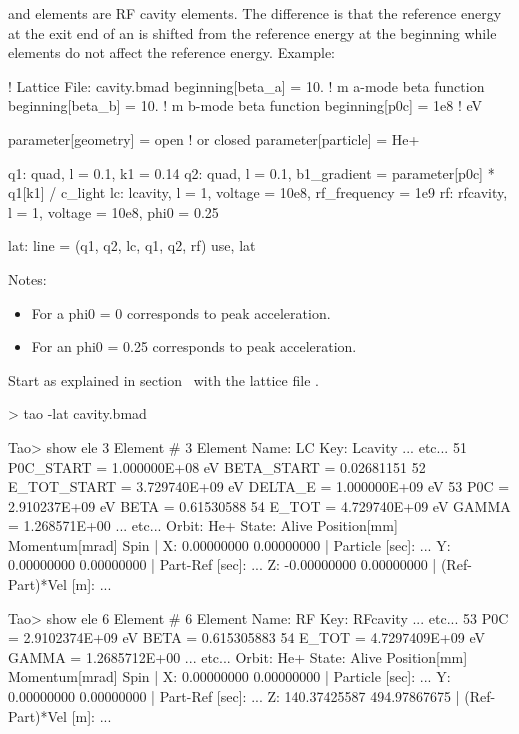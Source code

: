 \documentclass{hitec}
\begin{document}
 and   elements are RF cavity elements. The difference is that the reference
 energy at the exit end of an  is shifted from the reference energy at the beginning
 while  elements do not affect the reference energy. Example:
\begin{code}
! Lattice File: cavity.bmad
beginning[beta_a] = 10.   ! m  a-mode beta function
beginning[beta_b] = 10.   ! m  b-mode beta function
beginning[p0c] = 1e8   ! eV  

parameter[geometry] = open      ! or closed
parameter[particle] = He+ 

q1: quad, l = 0.1, k1 = 0.14
q2: quad, l = 0.1, b1_gradient = parameter[p0c] * q1[k1] / c_light
lc: lcavity, l = 1, voltage = 10e8, rf_frequency = 1e9
rf: rfcavity, l = 1, voltage = 10e8, phi0 = 0.25

lat: line = (q1, q2, lc, q1, q2, rf)
use, lat
\end{code}

Notes:
\begin{itemize}
\item For a  phi0 = 0 corresponds to peak acceleration.
\item For an  phi0 = 0.25 corresponds to peak acceleration.
\end{itemize}

Start \tao as explained in section~ with the lattice file
.

\begin{code}
> tao -lat cavity.bmad

Tao> show ele 3
Element #                3
Element Name: LC
Key: Lcavity
... etc...
   51   P0C_START    =  1.000000E+08 eV        BETA_START   =  0.02681151
   52   E_TOT_START  =  3.729740E+09 eV        DELTA_E      =  1.000000E+09 eV
   53   P0C          =  2.910237E+09 eV        BETA         =  0.61530588
   54   E_TOT        =  4.729740E+09 eV        GAMMA        =  1.268571E+00
... etc...    
Orbit:  He+   State: Alive
         Position[mm] Momentum[mrad]        Spin   |
  X:       0.00000000     0.00000000               | Particle [sec]:     ...
  Y:       0.00000000     0.00000000               | Part-Ref [sec]:     ...
  Z:      -0.00000000     0.00000000               | (Ref-Part)*Vel [m]: ...

Tao> show ele 6
Element #                6
Element Name: RF
Key: RFcavity
... etc...
   53   P0C         =  2.9102374E+09 eV         BETA      =  0.615305883
   54   E_TOT       =  4.7297409E+09 eV         GAMMA     =  1.2685712E+00
... etc...
 Orbit:  He+   State: Alive
         Position[mm] Momentum[mrad]        Spin   |
  X:       0.00000000     0.00000000               | Particle [sec]:     ...
  Y:       0.00000000     0.00000000               | Part-Ref [sec]:     ...
  Z:     140.37425587   494.97867675               | (Ref-Part)*Vel [m]: ...
\end{code}
\end{document}
